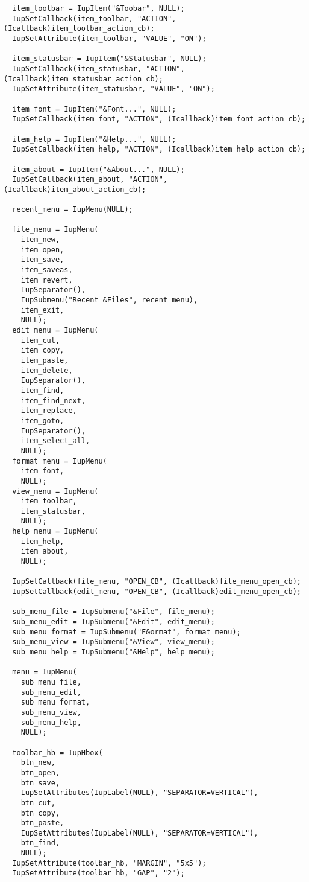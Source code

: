 \documentclass{ctexart}
\begin{document}
\begin{lstlisting}
  item_toolbar = IupItem("&Toobar", NULL);
  IupSetCallback(item_toolbar, "ACTION", (Icallback)item_toolbar_action_cb);
  IupSetAttribute(item_toolbar, "VALUE", "ON");

  item_statusbar = IupItem("&Statusbar", NULL);
  IupSetCallback(item_statusbar, "ACTION", (Icallback)item_statusbar_action_cb);
  IupSetAttribute(item_statusbar, "VALUE", "ON");

  item_font = IupItem("&Font...", NULL);
  IupSetCallback(item_font, "ACTION", (Icallback)item_font_action_cb);

  item_help = IupItem("&Help...", NULL);
  IupSetCallback(item_help, "ACTION", (Icallback)item_help_action_cb);

  item_about = IupItem("&About...", NULL);
  IupSetCallback(item_about, "ACTION", (Icallback)item_about_action_cb);

  recent_menu = IupMenu(NULL);

  file_menu = IupMenu(
    item_new,
    item_open,
    item_save,
    item_saveas,
    item_revert,
    IupSeparator(),
    IupSubmenu("Recent &Files", recent_menu),
    item_exit,
    NULL);
  edit_menu = IupMenu(
    item_cut,
    item_copy,
    item_paste,
    item_delete,
    IupSeparator(),
    item_find,
    item_find_next,
    item_replace,
    item_goto,
    IupSeparator(),
    item_select_all,
    NULL);
  format_menu = IupMenu(
    item_font,
    NULL);
  view_menu = IupMenu(
    item_toolbar,
    item_statusbar,
    NULL);
  help_menu = IupMenu(
    item_help,
    item_about,
    NULL);

  IupSetCallback(file_menu, "OPEN_CB", (Icallback)file_menu_open_cb);
  IupSetCallback(edit_menu, "OPEN_CB", (Icallback)edit_menu_open_cb);

  sub_menu_file = IupSubmenu("&File", file_menu);
  sub_menu_edit = IupSubmenu("&Edit", edit_menu);
  sub_menu_format = IupSubmenu("F&ormat", format_menu);
  sub_menu_view = IupSubmenu("&View", view_menu);
  sub_menu_help = IupSubmenu("&Help", help_menu);

  menu = IupMenu(
    sub_menu_file,
    sub_menu_edit,
    sub_menu_format,
    sub_menu_view,
    sub_menu_help,
    NULL);

  toolbar_hb = IupHbox(
    btn_new,
    btn_open,
    btn_save,
    IupSetAttributes(IupLabel(NULL), "SEPARATOR=VERTICAL"),
    btn_cut,
    btn_copy,
    btn_paste,
    IupSetAttributes(IupLabel(NULL), "SEPARATOR=VERTICAL"),
    btn_find,
    NULL);
  IupSetAttribute(toolbar_hb, "MARGIN", "5x5");
  IupSetAttribute(toolbar_hb, "GAP", "2");


\end{lstlisting}
\end{document}
